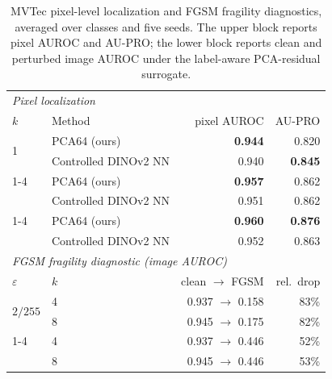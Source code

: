 \begin{table}[pos=t]
\centering
\caption{MVTec pixel-level localization and FGSM fragility diagnostics, averaged over classes and five seeds. The upper block reports pixel AUROC and AU-PRO; the lower block reports clean and perturbed image AUROC under the label-aware PCA-residual surrogate.}
\label{tab:pixel-diagnostics}
\footnotesize
\setlength{\tabcolsep}{4pt}
\begin{tabular}{llrr}
\toprule
\multicolumn{4}{l}{\emph{Pixel localization}} \\
$k$ & Method & pixel AUROC & AU-PRO \\
\midrule
\multirow{2}{*}{1} & PCA64 (ours) & \textbf{0.944} & 0.820 \\
  & Controlled DINOv2 NN & 0.940 & \textbf{0.845} \\
\cmidrule(lr){1-4}
\multirow{2}{*}{4} & PCA64 (ours) & \textbf{0.957} & 0.862 \\
  & Controlled DINOv2 NN & 0.951 & 0.862 \\
\cmidrule(lr){1-4}
\multirow{2}{*}{8} & PCA64 (ours) & \textbf{0.960} & \textbf{0.876} \\
  & Controlled DINOv2 NN & 0.952 & 0.863 \\
\midrule
\multicolumn{4}{l}{\emph{FGSM fragility diagnostic (image AUROC)}} \\
$\varepsilon$ & $k$ & clean $\to$ FGSM & rel.\ drop \\
\midrule
\multirow{2}{*}{$2/255$} & 4 & 0.937 $\to$ 0.158 & 83\% \\
        & 8 & 0.945 $\to$ 0.175 & 82\% \\
\cmidrule(lr){1-4}
\multirow{2}{*}{$8/255$} & 4 & 0.937 $\to$ 0.446 & 52\% \\
        & 8 & 0.945 $\to$ 0.446 & 53\% \\
\bottomrule
\end{tabular}
\end{table}
